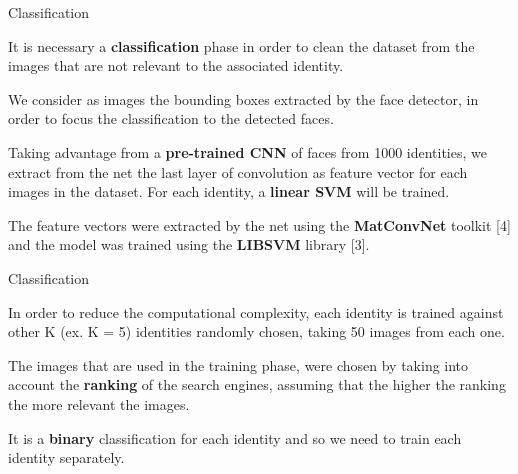 \begin{tframe}{Classification}

It is necessary a \textbf{classification} phase in order to clean the dataset from the images that are not relevant to the associated identity.

\vspace{0.1in}

We consider as images the bounding boxes extracted by the face detector, in order to focus the classification to the detected faces.

\vspace{0.1in}

Taking advantage from a \textbf{pre-trained CNN} of faces from 1000 identities, we extract from the net the last layer of convolution as feature vector for each images in the dataset. For each identity, a \textbf{linear SVM} will be trained.

\vspace{0.1in}

The feature vectors were extracted by the net using the \textbf{MatConvNet} toolkit [4] and the model was trained using the \textbf{LIBSVM} library [3].

\end{tframe}


\begin{tframe}{Classification}

In order to reduce the computational complexity, each identity is trained against other K (ex. K = 5) identities randomly chosen, taking 50 images from each one.

\vspace{0.1in}

The images that are used in the training phase, were chosen by taking into account the \textbf{ranking} of the search engines, assuming that the higher the ranking the more relevant the images.

\vspace{0.1in}

It is a \textbf{binary} classification for each identity and so we need to train each identity separately.

\end{tframe}